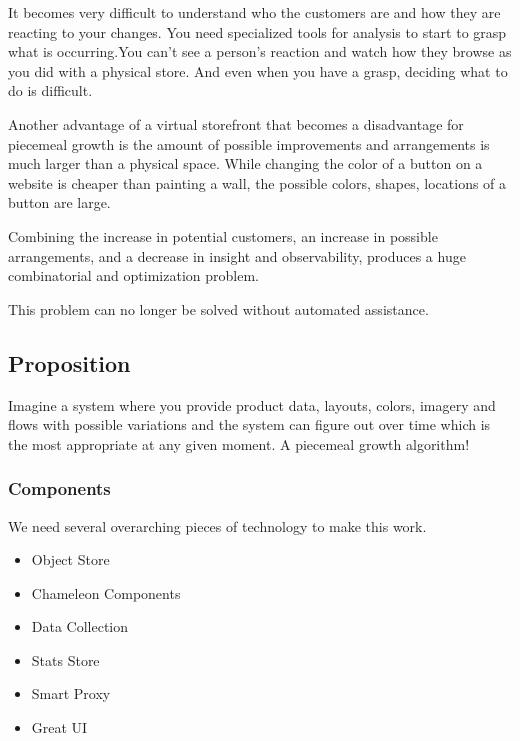 \documentclass[11pt]{article}
\begin{document}
It becomes very difficult to understand who the customers are and how they are reacting
to your changes. You need specialized tools for analysis to start to grasp
what is occurring.You can't see a person's reaction and watch how they browse as you did with
a physical store. And even when you have a grasp, deciding what to do is difficult.

Another advantage of a virtual storefront that becomes a disadvantage for piecemeal growth
is the amount of possible improvements and arrangements is much larger than
a physical space. While changing the color of a button on a website is cheaper
than painting a wall, the possible colors, shapes, locations of a button are large.

Combining the increase in potential customers, an increase in possible arrangements, and a
decrease in insight and observability, produces a huge combinatorial and optimization problem.

This problem can no longer be solved without automated assistance.

\subsection{Proposition}

Imagine a system where you provide product data, layouts, colors, imagery and flows 
with possible variations and the system can figure out over time which is the most appropriate
at any given moment. A piecemeal growth algorithm!

\subsubsection{Components}

We need several overarching pieces of technology to make this work.

\begin{itemize}
    \item Object Store
    \item Chameleon Components
    \item Data Collection
    \item Stats Store
    \item Smart Proxy 
    \item Great UI
\end{itemize}

\end{document}

